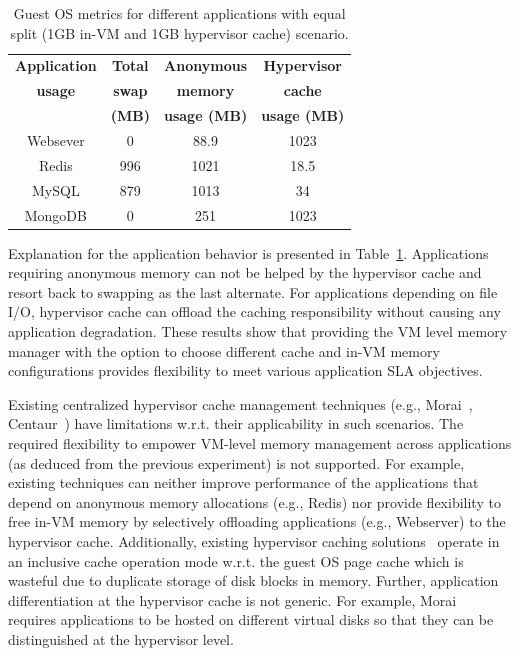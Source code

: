 \begin{table}[t]
\begin{center}
\begin{tabular}{|c|c|c|c|}
\hline
{\bf Application} & {\bf Total} & {\bf Anonymous} & {\bf Hypervisor} \\
{\bf usage } & {\bf swap} & {\bf memory} & {\bf cache} \\
 & {\bf (MB)} & {\bf usage (MB)} & {\bf usage (MB)} \\
\hline 
\hline 
Websever & 0 & 88.9 & 1023 \\
Redis & 996 &  1021 & 18.5 \\
MySQL & 879 & 1013 & 34 \\
MongoDB & 0 & 251 & 1023 \\
\hline 
\end{tabular}
\caption{Guest OS metrics for different applications with equal split (1GB in-VM and 1GB 
         hypervisor cache) scenario.}
\label{table:app_diagnosis}
\vspace{-1cm}
\end{center}
\end{table}

Explanation for the application behavior is presented in 
Table~\ref{table:app_diagnosis}.
%
Applications requiring anonymous memory can not be helped by the 
hypervisor cache and resort back to swapping as the last alternate.
%
For applications depending on file I/O, hypervisor cache 
can offload the caching responsibility without causing any
application degradation.
%
These results show that providing the VM level memory manager with the option
to choose different cache and in-VM memory configurations provides flexibility
to meet various application SLA objectives.

 
%
Existing centralized hypervisor cache management 
techniques (e.g., Morai~\cite{sdc}, Centaur~\cite{centaur}) have
limitations w.r.t. their applicability in such scenarios.
%
The required flexibility to empower VM-level memory management across
applications (as deduced from the previous experiment) is not supported.
%
For example, existing techniques can neither improve performance of the 
applications that depend on anonymous memory allocations (e.g., Redis) 
nor provide flexibility to free in-VM memory by selectively offloading 
applications (e.g., Webserver) to the hypervisor cache.
%
Additionally, existing hypervisor caching solutions~\cite{sdc,centaur}
%
operate in an inclusive cache operation mode
w.r.t. the guest OS page cache which is wasteful due to duplicate 
storage of disk blocks in memory.
%
Further, application differentiation at the hypervisor cache is not
generic. For example, Morai~\cite{sdc} requires applications to be 
hosted on different virtual disks so that they can be distinguished at the
hypervisor level.
%



